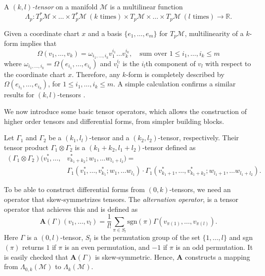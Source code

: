 \begin{definition}
A \emph{$(k,l)$-tensor} on a manifold $\mathcal M$ is a multilinear  function 
\[
	\Lambda_p:T_p^*\mathcal M \times \dots \times T_p^*\mathcal M \ (k \text{ times}) \times T_p\mathcal M \times \dots \times T_p\mathcal M \ (l \text{ times}) \to \mathbb R.
\]
\end{definition}

Given a coordinate chart $x$ and a basis $\{ e_1,\dots,e_m\}$ for $T_{p}\mathcal M$, multilinearity of a $k$-form implies that
\begin{equation} \label{eq:2.6}
	\Omega(v_1,\dots,v_k) = \omega_{i_1,\dots,i_k} v_{1}^{i_1}\dots v_{k}^{i_k}, \quad \text{sum over }1 \leq i_1,\dots,i_k \leq m
\end{equation}
where $\omega_{i_1,\dots,i_k} = \Omega(e_{i_1},\dots,e_{i_k})$ and $v_{l}^{i_l}$ is the $i_l$th component of $v_l$ with respect to the coordinate chart $x$. Therefore, any $k$-form is completely described by $\Omega(e_{i_1},\dots,e_{i_k})$, for $1 \leq i_1,\dots,i_k \leq m$. A simple calculation confirms a similar results for $(k,l)$-tensors \cite{Wald:106274}.

We now introduce some basic tensor operators, which allows the construction of higher order tensors and differential forms, from simpler building blocks.
\begin{definition}
	Let $\Gamma_1$ and $\Gamma_2$ be a $(k_1,l_l)$-tensor and a $(k_2,l_2)$-tensor, respectively. Their tensor product $\Gamma_1\otimes \Gamma_2$ is a $(k_1+k_2,l_1+l_2)$-tensor defined as
\[
	\begin{aligned}
	(\Gamma_1\otimes \Gamma_2)(v^*_1,\dots,&v^*_{k_1+k_2};w_1,\dots w_{l_1+l_2}) = \\
		&\Gamma_1(v^*_1,\dots,v^*_{k_1};w_1,\dots w_{l_1})\cdot \Gamma_1(v^*_{k_1+1},\dots,v^*_{k_1+k_2};w_{l_1+1},\dots w_{l_1+l_2}).
	\end{aligned}
\]
\end{definition}
To be able to construct differential forms from $(0,k)$-tensors, we need an operator that skew-symmetrizes tensors. The \emph{alternation operator}, is a tensor operator that achieves this and is defined as
\begin{equation} \label{eq:2.7}
	\textbf{A}(\Gamma)(v_1,\dots,v_l) = \frac{1}{l!} \sum_{\pi \in S_l} \text{sgn}(\pi) \Gamma(v_{\pi(1)},\dots,v_{\pi(l)}).
\end{equation}
Here $\Gamma$ is a $(0,l)$-tensor, $S_l$ is the permutation group of the set $\{1,\dots,l\}$ and sgn$(\pi)$ returns $1$ if $\pi$ is an even permutation, and $-1$ if $\pi$ is an odd permutation. It is easily checked that $\textbf{A}(\Gamma)$ is skew-symmetric. Hence, $\textbf{A}$ constructs a mapping from $\Lambda_{0,k}(\mathcal M)$ to $\Lambda_{k}(\mathcal M)$.

